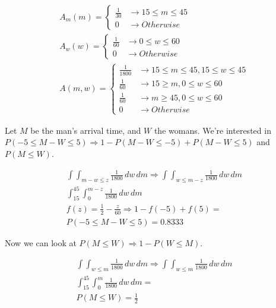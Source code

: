 \documentclass[11pt]{article}\usepackage[]{graphicx}\usepackage[]{xcolor}
\begin{document}
\begin{easylist}[enumerate]
    \[
        \begin{aligned}
            A_m(m) =
            \begin{cases}
                \frac{1}{30} &\to 15 \le m \le 45\\
                0 &\to Otherwise
            \end{cases}\\
            A_w(w) =
            \begin{cases}
                \frac{1}{60} &\to 0 \le w \le 60\\
                0 &\to Otherwise
            \end{cases}\\
            A(m, w) =
            \begin{cases}
                \frac{1}{1800} &\to 15 \le m \le 45, 15 \le w \le 45\\
                \frac{1}{60} &\to 15 \ge m, 0 \le w \le 60\\
                \frac{1}{60} &\to m \ge 45, 0 \le w \le 60\\
                0 &\to Otherwise
            \end{cases}
        \end{aligned}
    \]

    Let $M$ be the man's arrival time, and $W$ the womans. We're interested in $P(-5 \le M - W \le 5) \Rightarrow 1 -
    P(M - W \le -5) + P(M - W \le 5)$ and $P(M \le W)$.




    \[
        \begin{aligned}
            \int\int_{m - w \le z} \frac{1}{1800} \, dw \, dm \Rightarrow
                \int\int_{w \le m - z} \frac{1}{1800} \, dw \, dm\\
            \int^{45}_{15} \int_{0}^{m - z} \frac{1}{1800} \, dw \, dm\\
            f(z) = \frac{1}{2} - \frac{z}{60} \Rightarrow 1 - f(-5) + f(5) =\\
                \boxed{P(-5 \le M - W \le 5) = 0.8333}
        \end{aligned}
    \]

    Now we can look at $P(M \le W) \Rightarrow 1 - P(W \le M)$.

    \[
        \begin{aligned}
            \int \int_{w \le m} \frac{1}{1800} \, dw \, dm \Rightarrow \int \int_{w \le m} \frac{1}{1800} \, dw \, dm\\
            \int_{15}^{45} \int_0^m \frac{1}{1800} \, dw \, dm =\\
            \boxed{P(M \le W) = \frac{1}{2} }
        \end{aligned}
    \]


\end{easylist}
\end{document}
